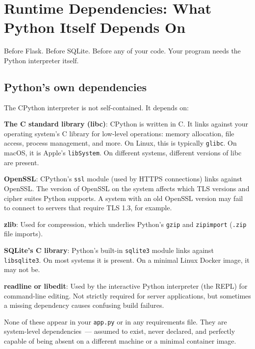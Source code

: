 \setcounter{section}{0}
\section{Runtime Dependencies: What Python Itself Depends On}\label{06-local-dependencies:61-runtime-dependencies-what-python-itself-depends-on}

Before Flask. Before SQLite. Before any of your code. Your program needs the Python interpreter itself.

\subsection*{Python's own dependencies}\label{06-local-dependencies:pythons-own-dependencies}

The CPython interpreter is not self-contained. It depends on:

\textbf{The C standard library (libc)}: CPython is written in C. It links against your operating system's C library for low-level operations: memory allocation, file access, process management, and more. On Linux, this is typically \texttt{glibc}. On macOS, it is Apple's \texttt{libSystem}. On different systems, different versions of libc are present.

\textbf{OpenSSL}: CPython's \texttt{ssl} module (used by HTTPS connections) links against OpenSSL. The version of OpenSSL on the system affects which TLS versions and cipher suites Python supports. A system with an old OpenSSL version may fail to connect to servers that require TLS 1.3, for example.

\textbf{zlib}: Used for compression, which underlies Python's \texttt{gzip} and \texttt{zipimport} (\texttt{.zip} file imports).

\textbf{SQLite's C library}: Python's built-in \texttt{sqlite3} module links against \texttt{libsqlite3}. On most systems it is present. On a minimal Linux Docker image, it may not be.

\textbf{readline or libedit}: Used by the interactive Python interpreter (the REPL) for command-line editing. Not strictly required for server applications, but sometimes a missing dependency causes confusing build failures.

None of these appear in your \texttt{app.py} or in any requirements file. They are system-level dependencies~--- assumed to exist, never declared, and perfectly capable of being absent on a different machine or a minimal container image.

